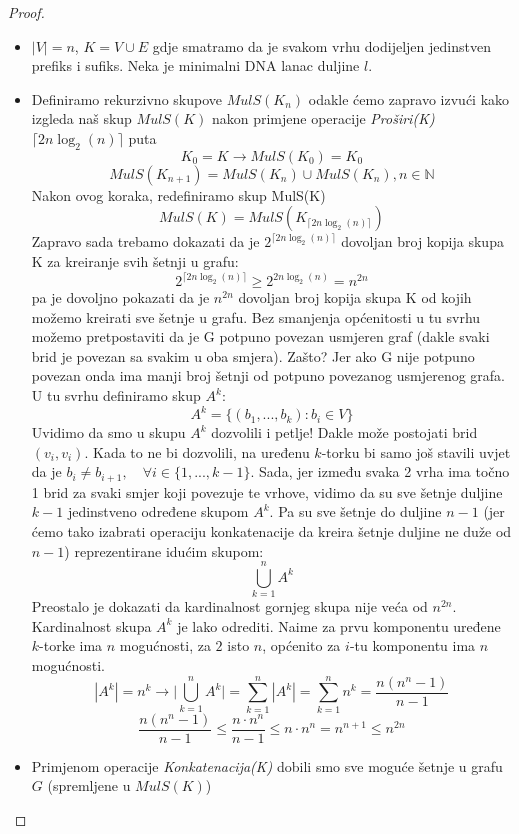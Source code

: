 \documentclass[12pt, a4paper]{book}
\begin{document}
\begin{spacing}{1.5}
\begin{proof}
    \begin{itemize}
        \item $|V|=n$, $K=V\cup E$ gdje smatramo da je svakom vrhu dodijeljen jedinstven prefiks i sufiks. Neka je minimalni DNA lanac duljine $l$.
        \item Definiramo rekurzivno skupove $MulS(K_n)$ odakle ćemo zapravo izvući kako izgleda naš skup $MulS(K)$ nakon primjene operacije \textit{Proširi(K)} $\lceil 2n\log_2(n) \rceil$ puta
        \[K_0=K \to MulS(K_0)=K_0\]
        \[MulS(K_{n+1})=MulS(K_n) \cup MulS(K_n) , n \in \mathbb{N}\]
        Nakon ovog koraka, redefiniramo skup MulS(K)
        \[MulS(K)=MulS(K_{\lceil 2n\log_2(n) \rceil})\]
        Zapravo sada trebamo dokazati da je $2^{\lceil 2n\log_2(n) \rceil}$ dovoljan broj kopija skupa K za kreiranje svih šetnji u grafu:
        \[2^{\lceil 2n\log_2(n) \rceil} \geq 2^{ 2n\log_2(n) } = n^{2n}\]
        pa je dovoljno pokazati da je $n^{2n}$ dovoljan broj kopija skupa K od kojih možemo kreirati sve šetnje u grafu. Bez smanjenja općenitosti u tu svrhu možemo pretpostaviti da je G potpuno povezan usmjeren graf (dakle svaki brid je povezan sa svakim u oba smjera). Zašto? Jer ako G nije potpuno povezan onda ima manji broj šetnji od potpuno povezanog usmjerenog grafa. \\
        \noindent U tu svrhu definiramo skup $A^k$:
        \[A^k=\{(b_1,...,b_k): b_i \in V\}\]
        Uvidimo da smo u skupu $A^k$ dozvolili i petlje! Dakle može postojati brid $(v_i, v_i)$. Kada to ne bi dozvolili, na uređenu $k$-torku bi samo još stavili uvjet da je $b_i \neq b_{i+1}, \quad \forall i \in \{1,...,k-1\}$.
        Sada, jer između svaka 2 vrha ima točno 1 brid za svaki smjer koji povezuje te vrhove, vidimo da su sve šetnje duljine $k-1$ jedinstveno određene skupom $A^k$. Pa su sve šetnje do duljine $n-1$ (jer ćemo tako izabrati operaciju konkatenacije da kreira šetnje duljine ne duže od $n-1$) reprezentirane idućim skupom:
        \[\bigcup_{k=1}^n A^k\]
        Preostalo je dokazati da kardinalnost gornjeg skupa nije veća od $n^{2n}$. Kardinalnost skupa $A^k$ je lako odrediti. Naime za prvu komponentu uređene $k$-torke ima $n$ mogućnosti, za $2$ isto $n$, općenito za $i$-tu komponentu ima $n$ mogućnosti.
        \[|A^k|=n^k \to \bigg|\bigcup_{k=1}^n A^k\bigg|=\sum_{k=1}^n |A^k|=\sum_{k=1}^n n^k=\frac{n(n^n-1)}{n-1}\]
        \[\frac{n(n^n-1)}{n-1} \leq \frac{n\cdot n^n}{n-1} \leq n\cdot n^n =n^{n+1} \leq n^{2n}\]
        \item Primjenom operacije \textit{Konkatenacija(K)} dobili smo sve moguće šetnje u grafu $G$ (spremljene u $MulS(K)$)

\end{itemize}
\end{proof}
\end{spacing}
\end{document}
